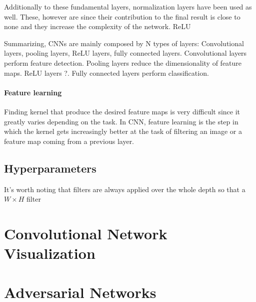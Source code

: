 Additionally to these fundamental layers, normalization layers have been used as well.
These, however are  since their contribution to the final result is close to none and they increase the complexity of the network.
ReLU \cite{Krizhevsky2012,Nair2010}




Summarizing, CNNs are mainly composed by N types of layers: Convolutional layers, pooling layers, ReLU layers, fully connected layers.
Convolutional layers perform feature detection.
Pooling layers reduce the dimensionality of feature maps.
ReLU layers ?.
Fully connected layers perform classification.

\paragraph{Feature learning}
Finding kernel that produce the desired feature maps is very difficult since it greatly varies depending on the task.
In CNN, feature learning is the step in which the kernel gets increasingly better at the task of filtering an image or a feature map coming from a previous layer.
\todo[inline]

\subsection{Hyperparameters}
\label{sub:concepts:hyperparameters}

It's worth noting that filters are always applied over the whole depth so that a ${W}\times{H}$ filter



\section{Convolutional Network Visualization}
\label{sec:theory:netvis}



\section{Adversarial Networks}
\label{sec:theory:adversarialnet}


